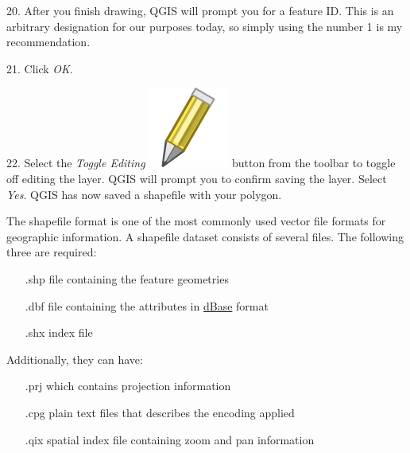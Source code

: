 \documentclass[oneside,a4paper,11pt,explicit]{book}
\begin{document}
	
	20. After you finish drawing, QGIS will prompt you for a feature ID. This is an arbitrary designation for our purposes today, so simply using the number 1 is my recommendation. 
	
	21. Click \textit{OK}. 
	
	22. Select the \textit{Toggle Editing} \includegraphics[height=\fontcharht\font`\B]{mActionToggleEditing.png} button from the toolbar to toggle off editing the layer. QGIS will prompt you to confirm saving the layer. Select \textit{Yes}. QGIS has now saved a shapefile with your polygon. 
	
	\begin{tcolorbox}[colback=yellow!5!white,colframe=IceCreamLeaf,title=\textbf{What Are Shapefiles?}]
		The shapefile format is one of the most commonly used vector file formats for geographic information. A shapefile dataset consists of several files. The following three are required:
			
		\begin{itemize}
			\centering
			\item[\color{orange} .shp] file containing the feature geometries
			\item[\color{orange} .dbf] file containing the attributes in \href{https://en.wikipedia.org/wiki/.dbf}{dBase} format
			\item[\color{orange} .shx] index file
		\end{itemize}
			
		Additionally, they can have: 
			
		\begin{itemize}
			\centering
			\item[\color{orange} .prj] which contains projection information
			\item[\color{orange} .cpg] plain text files that describes the encoding applied
			\item[\color{orange} .qix] spatial index file containing zoom and pan information
		\end{itemize}			
	\end{tcolorbox}
	
\end{document}
